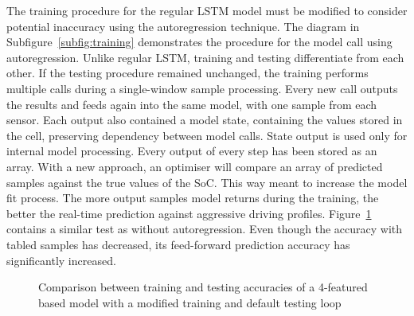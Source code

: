 %
%
The training procedure for the regular LSTM model must be modified to consider potential inaccuracy using the autoregression technique.
The diagram in \mbox{Subfigure~\ref{subfig:training}} demonstrates the procedure for the model call using autoregression.
Unlike regular LSTM, training and testing differentiate from each other.
If the testing procedure remained unchanged, the training performs multiple calls during a single-window sample processing.
Every new call outputs the results and feeds again into the same model, with one sample from each sensor.
Each output also contained a model state, containing the values stored in the cell, preserving dependency between model calls.
State output is used only for internal model processing.
Every output of every step has been stored as an array.
With a new approach, an optimiser will compare an array of predicted samples against the true values of the SoC.
This way meant to increase the model fit process.
The more output samples model returns during the training, the better the real-time prediction against aggressive driving profiles.
\mbox{Figure~\ref{fig:modefied_tr}} contains a similar test as without autoregression.
Even though the accuracy with tabled samples has decreased, its feed-forward prediction accuracy has significantly increased.
\begin{figure}[htbp]
    \centering
    \caption{Comparison between training and testing accuracies of a 4-featured based model with a modified training and default testing loop}
    \label{fig:modefied_tr}
\end{figure}